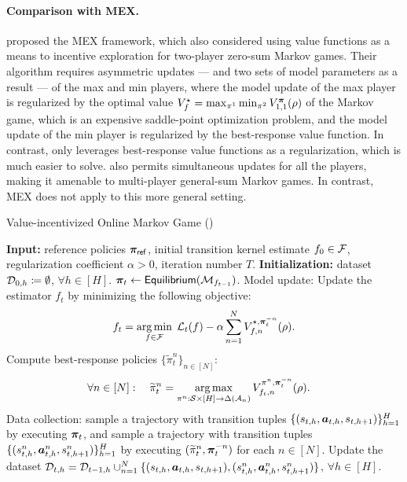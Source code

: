 \paragraph{Comparison with MEX.} \citet[Algorithm~2]{liu2024maximize} proposed the MEX framework, which also considered using value functions as a means to incentive exploration for   two-player zero-sum Markov games. Their algorithm requires asymmetric updates --- and two sets of model parameters as a result --- of the max and min players, where the model update of the max player is regularized by the optimal value $V_f^{\star} = \max_{\pi^1}\min_{\pi^2} V_{1,1}^{{\bm{\pi}}}(\rho)$ of the Markov game, which is an expensive saddle-point optimization problem, and the model update of the min player is regularized by the best-response value function. In contrast, \name only leverages best-response value functions as a regularization, which is much easier to solve. \name also permits simultaneous  updates for all the players, making it amenable to multi-player general-sum Markov games. In contrast, MEX does not apply to this more general setting.

 


\begin{algorithm}[!thb]
    \caption{Value-incentivized Online Markov Game (\name)}
    \label{alg:markov_game}
    \begin{algorithmic}[1]
    \STATE \textbf{Input:} reference policies ${\bm{\pi}}_{\mathsf{ref}}$, initial transition kernel estimate $f_0\in{\mathcal{F}}$, regularization coefficient $\alpha>0$, iteration number $T$.
    \STATE \textbf{Initialization:} dataset ${\mathcal{D}}_{0,h}\coloneqq \emptyset$, $\forall  h\in[H]$.  
    \STATE ${\bm{\pi}}_t \leftarrow \mathsf{Equilibrium}({\mathcal{M}}_{f_{t-1}})$. 
    \STATE Model update: Update the estimator $f_t$ by minimizing the following objective:
    \begin{align}\label{eq:model_update_mg}         
        f_t=\operatorname*{arg\,min}_{f\in{\mathcal{F}}}\; {\mathcal{L}}_t(f)  - \alpha \sum_{n=1}^N V_{f,n}^{\star,{\bm{\pi}}_t^{-n}}(\rho) .
    \end{align}
    \STATE Compute best-response policies $\{\widetilde{\pi}_t^n\}_{n\in[N]}$:
    \begin{align}\label{eq:policy_update_2_mg}
        \forall n\in[N]:\quad \widetilde{\pi}_t^n& = \operatorname*{arg\,max}_{\pi^n:{\mathcal{S}}\times[H]\rightarrow\Delta({\mathcal{A}}_n)} V_{f_t,n}^{\pi^n,{\bm{\pi}}_t^{-n}}(\rho).
    \end{align}
    \STATE Data collection: 
    sample a trajectory with transition tuples $\{(s_{t,h},{\bm{a}}_{t,h}, s_{t,h+1})\}_{h=1}^H$ by executing ${\bm{\pi}}_t$, and sample a trajectory with transition tuples $\{(s_{t,h}^n,{\bm{a}}_{t,h}^n, s_{t,h+1}^n)\}_{h=1}^H$ by executing $(\widetilde{\pi}_t^n,{\bm{\pi}}_t^{-n})$
    for each $n\in[N]$.
    Update the dataset  ${\mathcal{D}}_{t,h} = {\mathcal{D}}_{t-1,h}  \cup_{n=1}^N \{ (s_{t,h},{\bm{a}}_{t,h},s_{t,h+1}), (s_{t,h}^n,{\bm{a}}_{t,h}^n,s_{t,h+1}^n) \}$, $\forall h\in[H]$.  
    \ENDFOR 
    \end{algorithmic}
\end{algorithm}
 

